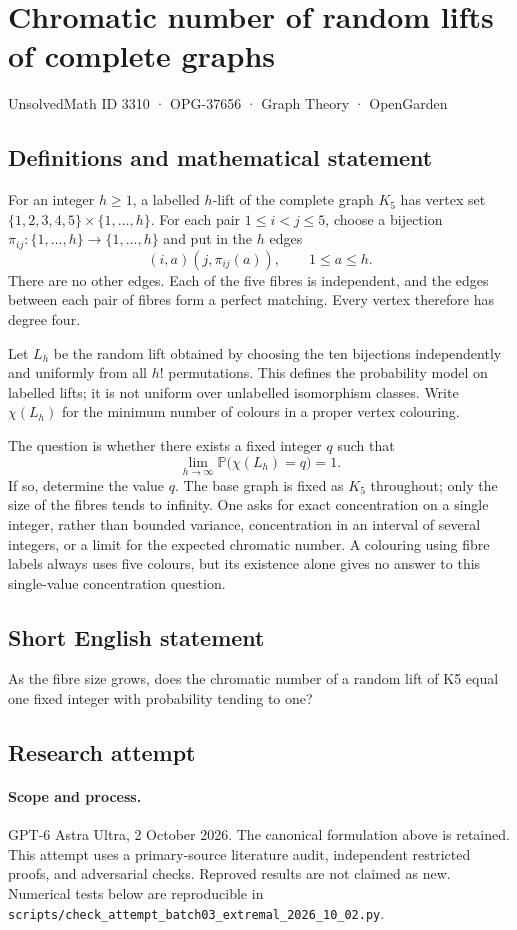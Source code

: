 \documentclass[11pt,a4paper]{article}
\begin{document}
\section*{Chromatic number of random lifts of complete graphs}\label{3310}
{\small UnsolvedMath ID 3310 · OPG-37656 · Graph Theory · OpenGarden}
\subsection{Definitions and mathematical statement}
For an integer $h\ge1$, a labelled $h$-lift of the complete graph $K_5$
has vertex set $\{1,2,3,4,5\}\times\{1,\ldots,h\}$. For each pair
$1\le i<j\le5$, choose a bijection
$\pi_{ij}:\{1,\ldots,h\}\to\{1,\ldots,h\}$ and put in the $h$ edges
\[
                       (i,a)(j,\pi_{ij}(a)),\qquad 1\le a\le h.
\]
There are no other edges. Each of the five fibres is independent,
and the edges between each pair of fibres form a perfect matching.
Every vertex therefore has degree four.

Let $L_h$ be the random lift obtained by choosing the ten bijections
independently and uniformly from all $h!$ permutations. This defines
the probability model on labelled lifts; it is not uniform over
unlabelled isomorphism classes. Write $\chi(L_h)$ for the minimum
number of colours in a proper vertex colouring.

The question is whether there exists a fixed integer $q$ such that
\[
                     \lim_{h\to\infty}
                     \mathbb P\bigl(\chi(L_h)=q\bigr)=1.
\]
If so, determine the value $q$. The base graph is fixed as $K_5$
throughout; only the size of the fibres tends to infinity. One asks
for exact concentration on a single integer, rather than bounded
variance, concentration in an interval of several integers, or a
limit for the expected chromatic number. A colouring using fibre
labels always uses five colours, but its existence alone gives no
answer to this single-value concentration question.
\subsection{Short English statement}
As the fibre size grows, does the chromatic number of a random lift of K5 equal one fixed integer with probability tending to one?
\subsection{Research attempt}
\paragraph{Scope and process.}
GPT-6 Astra Ultra, 2 October 2026. The canonical formulation above is retained. This attempt uses a primary-source literature audit, independent restricted proofs, and adversarial checks. Reproved results are not claimed as new. Numerical tests below are reproducible in \texttt{scripts/check\_attempt\_batch03\_extremal\_2026\_10\_02.py}.
\end{document}
